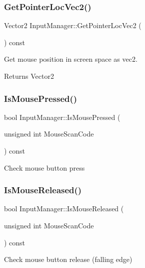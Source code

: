 \subsubsection{\texorpdfstring{Get\+Pointer\+Loc\+Vec2()}{GetPointerLocVec2()}}
{\footnotesize\ttfamily Vector2 Input\+Manager\+::\+Get\+Pointer\+Loc\+Vec2 (\begin{DoxyParamCaption}{ }\end{DoxyParamCaption}) const}



Get mouse position in screen space as vec2. 

\begin{DoxyReturn}{Returns}
Vector2 
\end{DoxyReturn}
\mbox{\label{classInputManager_a7f316cdb11213c7973a0b601a0193d8a}} 
\subsubsection{\texorpdfstring{Is\+Mouse\+Pressed()}{IsMousePressed()}}
{\footnotesize\ttfamily bool Input\+Manager\+::\+Is\+Mouse\+Pressed (\begin{DoxyParamCaption}\item[{unsigned int}]{Mouse\+Scan\+Code }\end{DoxyParamCaption}) const}

Check mouse button press \mbox{\label{classInputManager_af72d6f8ceb3219220b36a6cc447a42db}} 
\subsubsection{\texorpdfstring{Is\+Mouse\+Released()}{IsMouseReleased()}}
{\footnotesize\ttfamily bool Input\+Manager\+::\+Is\+Mouse\+Released (\begin{DoxyParamCaption}\item[{unsigned int}]{Mouse\+Scan\+Code }\end{DoxyParamCaption}) const}

Check mouse button release (falling edge) \mbox{\label{classInputManager_a036f8dd3a4416c43b0c2942a3c5bb093}} 
